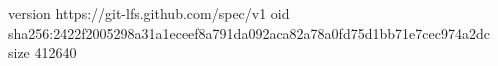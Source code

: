version https://git-lfs.github.com/spec/v1
oid sha256:2422f2005298a31a1eceef8a791da092aca82a78a0fd75d1bb71e7cec974a2dc
size 412640
